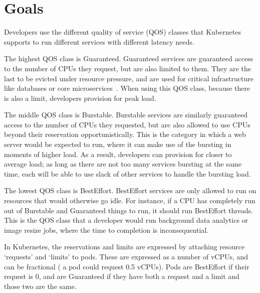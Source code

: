 \section{Goals}
\label{s:goals}


Developers use the different quality of service (QOS) classes that Kubernetes
supports to run different services with different latency needs.

The highest QOS class is Guaranteed. Guaranteed services are guaranteed access
to the number of CPUs they request, but are also limited to them. They are the
last to be evicted under resource pressure, and are used for critical
infrastructure like databases or core microservices~\cite{reddit-kub-qos}. When
using this QOS class, because there is also a limit, developers provision for
peak load.

The middle QOS class is Burstable. Burstable services are similarly guaranteed
access to the number of CPUs they requested, but are also allowed to use CPUs
beyond their reservation opportunistically. This is the category in which a web
server would be expected to run, where it can make use of the bursting in
moments of higher load. As a result, developers can provision for closer to
average load; as long as there are not too many services bursting at the same
time, each will be able to use slack of other services to handle the bursting
load.

The lowest QOS class is BestEffort. BestEffort services are only allowed to run
on resources that would otherwise go idle. For instance, if a CPU has completely
run out of Burstable and Guaranteed things to run, it should run BestEffort
threads. This is the QOS class that a developer would run background data
analytics or image resize jobs, where the time to completion is inconsequential.

In Kubernetes, the reservations and limits are expressed by attaching resource
`requests' and `limits' to pods. These are expressed as a number of vCPUs, and
can be fractional (\ie{} a pod could request 0.5 vCPUs). Pods are BestEffort if
their request is 0, and are Guaranteed if they have both a request and a limit
and those two are the same.

